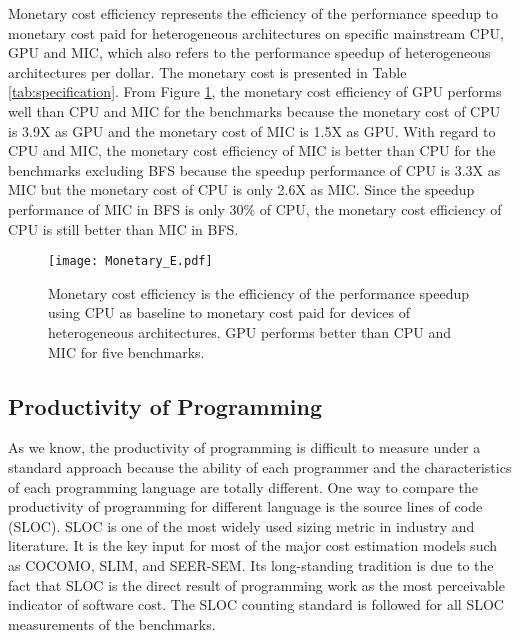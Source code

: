 Monetary cost efficiency represents the efficiency of the performance speedup to monetary cost paid for heterogeneous architectures on specific mainstream CPU, GPU and MIC, which also refers to the performance speedup of heterogeneous architectures per dollar. The monetary cost is presented in Table \ref{tab:specification}. From Figure \ref{fig:monetaryE}, the monetary cost efficiency of GPU performs well than CPU and MIC for the benchmarks because the monetary cost of CPU is 3.9X as GPU and the monetary cost of MIC is 1.5X as GPU. With regard to CPU and MIC, the monetary cost efficiency of MIC is better than CPU for the benchmarks excluding BFS because the speedup performance of CPU is 3.3X as MIC but the monetary cost of CPU is only 2.6X as MIC. Since the speedup performance of MIC in BFS is only 30\% of CPU, the monetary cost efficiency of CPU is still better than MIC in BFS.

    \begin{figure}[h!]
  \centering
  \begin{minipage}{0.5\textwidth}
    \centering
   \centering
     \texttt{[image: Monetary\_E.pdf]}    
\caption{Monetary cost efficiency is the efficiency of the performance speedup using CPU as baseline to monetary cost paid for devices of heterogeneous architectures. GPU performs better than CPU and MIC for five benchmarks.}
\label{fig:monetaryE}
\end{minipage}%
\end{figure}


\subsection{Productivity of Programming} 
As we know, the productivity of programming is difficult to measure under a standard approach because the ability of each programmer and the characteristics of each programming language are totally different. One way to compare the productivity of programming for different language is the source lines of code (SLOC). SLOC is one of the most widely used sizing metric in industry and literature. It is the key input for most of the major cost estimation models such as COCOMO, SLIM, and SEER-SEM.  Its long-standing tradition is due to the fact that SLOC is the direct result of programming work as the most perceivable indicator of software cost. The SLOC counting standard \cite{nguyen2007sloc} is followed for all SLOC measurements of the benchmarks.

